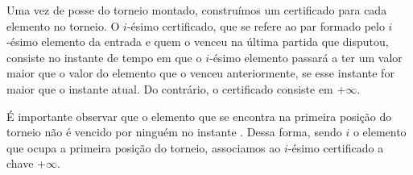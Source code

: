 Uma vez de posse do torneio montado, construímos um
certificado para cada elemento no torneio. O $i$-ésimo
certificado, que se refere ao par formado pelo $i$-ésimo
elemento da entrada e quem o venceu na última partida que
disputou, consiste no instante de tempo em que o $i$-ésimo
elemento passará a ter um valor maior que o valor do
elemento que o venceu anteriormente, se esse instante
for maior que o instante atual. Do contrário, o certificado
consiste em $+\infty$. %


É importante observar que o elemento que se encontra na
primeira posição do torneio não é vencido por ninguém no
instante \now. Dessa forma, sendo $i$ o elemento que ocupa
a primeira posição do torneio, associamos ao $i$-ésimo
certificado a chave $+\infty$.

